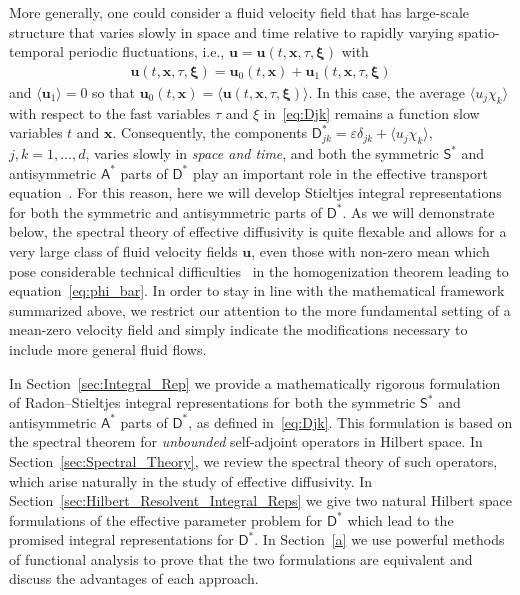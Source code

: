 \documentclass[leqno,onefignum,onetabnum]{siamltex1213}
\newcommand{\secref}[1]{Section~\ref{#1}}
\newcommand{\Dm}{\mathsf{D}}
\newcommand{\Sm}{\mathsf{S}}
\newcommand{\Am}{\mathsf{A}}
\newcommand{\vecx}{\boldsymbol{x}}
\newcommand{\vecu}{\boldsymbol{u}}
\newcommand{\vecxi}{\boldsymbol{\xi}}
\begin{document}
More generally, one could consider a fluid velocity field that has 
large-scale structure that varies slowly in space and time relative to
rapidly varying spatio-temporal periodic fluctuations, i.e.,
$\vecu=\vecu(t,\vecx,\tau,\vecxi)$ with 
%
\begin{align}
  \vecu(t,\vecx,\tau,\vecxi)=\vecu_0(t,\vecx)+\vecu_1(t,\vecx,\tau,\vecxi)
\end{align}
%
and $\langle\vecu_1\rangle=0$ so that
$\vecu_0(t,\vecx)=\langle\vecu(t,\vecx,\tau,\vecxi)\rangle$. In this case, the
average $\langle u_j\chi_k\rangle$ with respect to the fast variables $\tau$ and $\xi$
in~\eqref{eq:Djk} remains a function slow variables $t$ and
$\vecx$. Consequently, the components $\Dm_{jk}^*=\varepsilon\delta_{jk}+\langle u_j\chi_k\rangle$,
$j,k=1,\ldots,d$, varies slowly in \emph{space and time}, and both the
symmetric $\Sm^*$ and antisymmetric $\Am^*$ parts of $\Dm^*$ play an
important role in the effective transport
equation~\cite{Pavliotis:PHD_Thesis,McLaughlin:Forest:PF:1999:880}. For
this reason, here we will develop Stieltjes integral representations
for both the symmetric and antisymmetric parts of $\Dm^*$. As we will
demonstrate below, the spectral theory of effective diffusivity is
quite flexable and allows for a very large class of fluid velocity
fields $\vecu$, even those with non-zero mean which pose considerable
technical difficulties~\cite{Majda:Kramer:1999:book} in the
homogenization theorem leading to equation~\eqref{eq:phi_bar}. In
order to stay in line with the mathematical framework summarized
above, we restrict our attention to the more fundamental setting of a
mean-zero velocity field and simply indicate the modifications
necessary to include more general fluid flows.




In \secref{sec:Integral_Rep} we provide a mathematically rigorous
formulation of Radon--Stieltjes integral representations for both the
symmetric $\Sm^*$ and antisymmetric $\Am^*$ parts of $\Dm^*$, as defined
in~\eqref{eq:Djk}. This formulation is based on the spectral theorem
for \emph{unbounded} self-adjoint operators in Hilbert space. In 
\secref{sec:Spectral_Theory}, we review the spectral theory of such
operators, which arise naturally in the study of effective
diffusivity. In \secref{sec:Hilbert_Resolvent_Integral_Reps} we give
two natural Hilbert space formulations of the effective parameter
problem for $\Dm^*$ which lead to the promised integral
representations for $\Dm^*$. In \secref{a} we use powerful methods of
functional analysis to prove that the two formulations are equivalent
and discuss the advantages of each approach.
\end{document}
